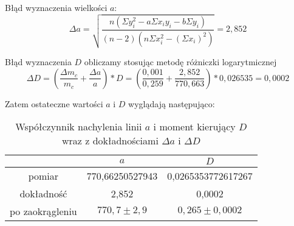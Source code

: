 \documentclass[10pt,a4paper]{article}
\newcommand{\forceindent}{\leavevmode{\parindent=3em\indent}}
\begin{document}
Błąd wyznaczenia wielkości $a$:\\
$$ \Delta a = \sqrt{\frac{n(\Sigma y_i ^2 - a \Sigma x_i y_i - b\Sigma y_i)}{(n-2)(n \Sigma x_i ^2 - (\Sigma x_i)^2)}} = 2,852$$

Błąd wyznaczenia $D$ obliczamy stosując metodę różniczki logarytmicznej
$$ \Delta D = (\frac{\Delta m_c}{m_c} + \frac{\Delta a}{a}) * D = (\frac{0,001}{0,259} + \frac{2,852}{770,663})*0,026535 = 0,0002$$

\forceindent Zatem ostateczne wartości $a$ i $D$ wyglądają następująco:

\begin{table}[!h]
\centering
\begin{tabular}{|cc||c|}
\multicolumn{1}{c}{} & \multicolumn{1}{c}{$a$} & \multicolumn{1}{c}{$D$}\\
\hline
pomiar & 770,66250527943 & 0,0265353772617267\\
\hline
dokładność & 2,852 & 0,0002\\
\hline
po zaokrągleniu & $ 770,7 \pm 2,9 $  & $ 0,265 \pm 0,0002 $ \\
\hline
\end{tabular}
\caption{Współczynnik nachylenia linii $a$ i moment kierujący $D$ wraz z dokładnościami $\Delta a$ i $\Delta D$}
\end{table}
\end{document}
